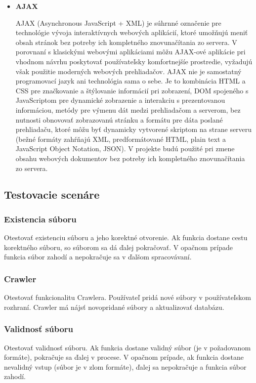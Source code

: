 \documentclass[12pt,a4paper]{article}
\begin{document}
\begin{itemize}
	\item{\bf AJAX} \par
	AJAX (Asynchronous JavaScript + XML) je súhrnné označenie pre technológie vývoja interaktívnych webových aplikácií, ktoré umožňujú meniť obsah stránok bez potreby ich kompletného znovunačítania zo servera. V porovnaní s klasickými webovými aplikáciami môžu AJAX-ové aplikácie pri vhodnom návrhu poskytovať používateľsky komfortnejšíe prostredie, vyžadujú však použitie moderných webových prehliadačov. AJAX nie je samostatný programovací jazyk ani technológia sama o sebe. Je to kombinácia HTML a CSS pre značkovanie a štýlovanie informácií pri zobrazení, DOM spojeného s JavaScriptom pre dynamické zobrazenie a interakciu s prezentovanou informáciou, metódy pre výmenu dát medzi prehliadačom a serverom, bez nutnosti obnovovať zobrazovanú stránku a formátu pre dáta poslané prehliadaču, ktoré môžu byť dynamicky vytvorené skriptom na strane serveru (bežné formáty zahŕňajú XML, predformátované HTML, plain text a JavaScript Object Notation, JSON). V projekte budú použité pri zmene obsahu webových dokumentov bez potreby ich kompletného znovunačítania zo servera.
\end{itemize}

\subsection{Testovacie scenáre}

\subsubsection{Existencia súboru}
Otestovať existenciu súboru a jeho korektné otvorenie. Ak funkcia dostane cestu korektného súboru, so súborom sa dá ďalej pokračovať. V opačnom prípade funkcia súbor zahodí a nepokračuje sa v ďalšom spracovávaní.

\subsubsection{Crawler}
Otestovať funkcionalitu Crawlera. Používateľ pridá nové súbory v používateľskom rozhraní. Crawler má nájsť novopridané súbory a aktualizovať databázu. 

\subsubsection{Validnosť súboru}
Otestovať validnosť súboru. Ak funkcia dostane validný súbor (je v požadovanom formáte), pokračuje sa ďalej v procese. V opačnom prípade, ak funkcia dostane nevalidný vstup (súbor je v zlom formáte), ďalej sa nepokračuje a funkcia súbor zahodí.
\end{document}
